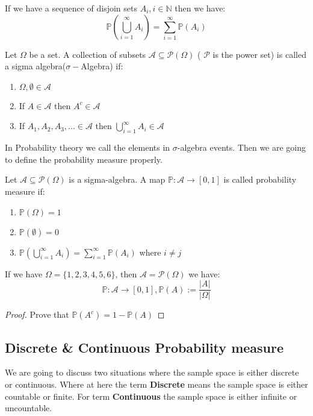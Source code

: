 \documentclass{article}
\newcommand{\N}{\mathbb{N}}
\newcommand{\Prob}{\mathbb{P}}
\begin{document}
\begin{theorem}
	If we have a sequence of disjoin sets $A_i,i\in \N$ then we have:
	\begin{equation*}
		\Prob(\bigcup_{i=1}^{\infty}A_i)=\sum_{i=1}^{\infty}\Prob(A_i)
	\end{equation*}
\end{theorem}

\begin{definition}
	Let $\Omega$ be a set. A collection of subsets $\mathcal{A}\subseteq \mathcal{P}(\Omega)$ ( $\mathcal{P}$ is the power set) is called a sigma algebra($\sigma-$Algebra) if:
	\begin{enumerate}
		\item $\Omega,\emptyset\in \mathcal{A}$
		\item If $A\in \mathcal{A}$ then $A^c\in \mathcal{A}$
		\item If $A_1,A_2,A_3,...\in \mathcal{A}$ then $\bigcup_{i=1}^{\infty}A_i\in \mathcal{A}$
	\end{enumerate}
\end{definition}

In Probability theory we call the elements in $\sigma$-algebra events. Then we are going to define the probability measure properly.
\begin{definition}
	Let $\mathcal{A}\subseteq \mathcal{P}(\Omega)$ is a sigma-algebra. A map $\Prob: \mathcal
	{A}\to [0,1]$ is called probability measure if:
	\begin{enumerate}
		\item $\Prob(\Omega)=1$
		\item $\Prob(\emptyset)=0$
		\item $\Prob(\bigcup_{i=1}^{\infty}A_i)=\sum_{i=1}^{\infty}\Prob(A_i)$ where $i\neq j$
	\end{enumerate} 
\end{definition}

\begin{example}
	If we have $\Omega=\{1,2,3,4,5,6\}$, then $\mathcal{A}=\mathcal{P}(\Omega)$ we have:
	\begin{equation*}
		\Prob: \mathcal{A}\to [0,1],\Prob(A):=\frac{|A|}{|\Omega |}
	\end{equation*}
\end{example}

\begin{proof}
	Prove that $\Prob( A^c)=1-\Prob(A)$
\end{proof}

\subsection{Discrete \& Continuous Probability measure}
We are going to discuss two situations where the sample space is either discrete or continuous. Where at here the term \textbf{Discrete} means the sample space is either countable or finite. For term \textbf{Continuous} the sample space is either infinite or uncountable.
\end{document}
